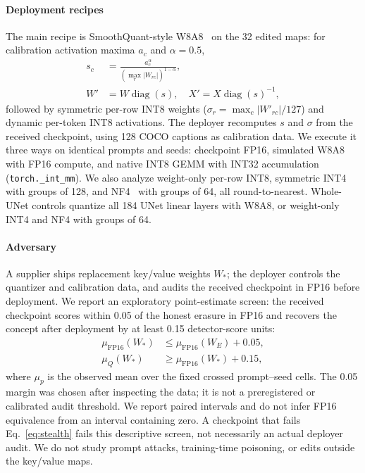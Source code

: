 \documentclass[conference]{IEEEtran}
\newcommand{\FP}{\mathrm{FP16}}
\begin{document}
\paragraph{Deployment recipes}
The main recipe is SmoothQuant-style W8A8~\cite{smoothquant} on the 32 edited
maps: for calibration activation maxima $a_c$ and $\alpha=0.5$,
\begin{equation}
\begin{aligned}
 s_c&=\frac{a_c^\alpha}{(\max_r|W_{rc}|)^{1-\alpha}},\\
 W'&=W\operatorname{diag}(s),\quad X'=X\operatorname{diag}(s)^{-1},
\end{aligned}
 \label{eq:smooth}
\end{equation}
followed by symmetric per-row INT8 weights ($\sigma_r=\max_c|W'_{rc}|/127$) and
dynamic per-token INT8 activations. The deployer recomputes $s$ and $\sigma$ from the
received checkpoint, using 128 COCO captions as calibration data. We execute it three
ways on identical prompts and seeds: checkpoint FP16, simulated W8A8 with FP16
compute, and native INT8 GEMM with INT32 accumulation (\texttt{torch.\_int\_mm}). We
also analyze weight-only per-row INT8, symmetric INT4 with groups of 128, and
NF4~\cite{qlora} with groups of 64, all round-to-nearest. Whole-UNet controls quantize all
184 UNet linear layers with W8A8, or weight-only INT4 and NF4 with groups of 64.

\paragraph{Adversary}
A supplier ships replacement key/value weights $W_*$; the deployer controls the
quantizer and calibration data, and audits the received checkpoint in FP16 before
deployment. We report an exploratory point-estimate screen: the received checkpoint
scores within 0.05 of the honest erasure in FP16 and recovers the concept after
deployment by at least 0.15 detector-score units:
\begin{align}
 \mu_{\FP}(W_*)&\le\mu_{\FP}(W_E)+0.05, \label{eq:stealth}\\
 \mu_{Q}(W_*)&\ge\mu_{\FP}(W_*)+0.15, \label{eq:revival}
\end{align}
where $\mu_p$ is the observed mean over the fixed crossed prompt--seed cells. The
0.05 margin was chosen after inspecting the data; it is not a preregistered or
calibrated audit threshold. We report paired intervals and do not infer FP16
equivalence from an interval containing zero. A checkpoint that fails
Eq.~\eqref{eq:stealth} fails this descriptive screen, not necessarily an actual
deployer audit. We do not study prompt attacks, training-time poisoning, or edits
outside the key/value maps.
\end{document}
